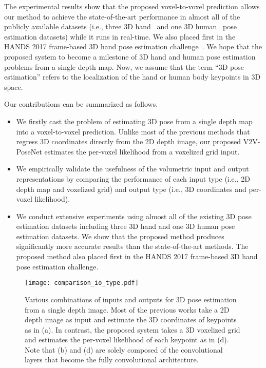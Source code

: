 \documentclass[10pt,twocolumn,letterpaper]{article}
\begin{document}
The experimental results show that the proposed voxel-to-voxel prediction allows our method to achieve the state-of-the-art performance in almost all of the publicly available datasets (i.e., three 3D hand~\cite{tompson2014real,tang2014latent,sun2015cascaded} and one 3D human~\cite{haque2016towards} pose estimation datasets) while it runs in real-time. We also placed first in the HANDS 2017 frame-based 3D hand pose estimation challenge~\cite{yuan20172017}. We hope that the proposed system to become a milestone of 3D hand and human pose estimation problems from a single depth map. Now, we assume that the term \enquote{3D pose estimation} refers to the localization of the hand or human body keypoints in 3D space.

Our contributions can be summarized as follows. 
\begin{itemize}
\item We firstly cast the problem of estimating 3D pose from a single depth map into a voxel-to-voxel prediction. Unlike most of the previous methods that regress 3D coordinates directly from the 2D depth image, our proposed V2V-PoseNet estimates the per-voxel likelihood from a voxelized grid input. 

\item We empirically validate the usefulness of the volumetric input and output representations by comparing the performance of each input type (i.e., 2D depth map and voxelized grid) and output type (i.e., 3D coordinates and per-voxel likelihood).

\item We conduct extensive experiments using almost all of the existing 3D pose estimation datasets including three 3D hand and one 3D human pose estimation datasets. We show that the proposed method produces significantly more accurate results than the state-of-the-art methods. The proposed method also placed first in the HANDS 2017 frame-based 3D hand pose estimation challenge.
\end{itemize}
 \begin{figure*}
\begin{center}
\texttt{[image: comparison\_io\_type.pdf]}
\end{center}
\vspace*{-5mm}
   \caption{Various combinations of inputs and outputs for 3D pose estimation from a single depth image. Most of the previous works take a 2D depth image as input and estimate the 3D coordinates of keypoints as in (a). In contrast, the proposed system takes a 3D voxelized grid and estimates the per-voxel likelihood of each keypoint as in (d). Note that (b) and (d) are solely composed of the convolutional layers that become the fully convolutional architecture.}
\label{fig:comparison_io_type}
\end{figure*}
\end{document}
